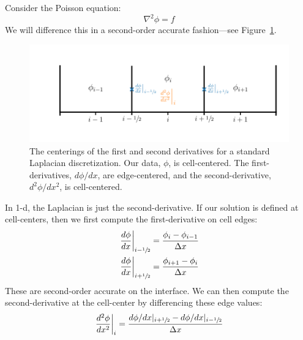 Consider the Poisson equation:
\begin{equation}
\nabla^2 \phi = f
\end{equation}
We will difference this in a second-order accurate fashion---see
Figure~\ref{fig:mg:laplacian}.  
\begin{figure}[t]
\centering
\includegraphics[width=\linewidth]{laplacian}
\caption{\label{fig:mg:laplacian} The centerings of the first and second
derivatives for a standard Laplacian discretization.  Our data, $\phi$,
is cell-centered.  The first-derivatives, $d\phi/dx$, are edge-centered, and the
second-derivative, $d^2\phi/dx^2$, is cell-centered.}
\end{figure}
%
In 1-d, the Laplacian is just the second-derivative.  If our solution
is defined at cell-centers, then we first compute the first-derivative
on cell edges:
\begin{align}
\left . \frac{d\phi}{dx} \right |_{i-{\sfrac{1}{2}}} &= \frac{\phi_i - \phi_{i-1}}{\Delta x}\\
\left . \frac{d\phi}{dx} \right |_{i+{\sfrac{1}{2}}} &= \frac{\phi_{i+1} - \phi_i}{\Delta x}
\end{align}
These are second-order accurate on the interface.  We can then compute
the second-derivative at the cell-center by differencing these edge values:
\begin{equation}
\left . \frac{d^2\phi}{dx^2} \right |_i = \frac{ d\phi/dx |_{i+{\sfrac{1}{2}}} - d\phi/dx |_{i-{\sfrac{1}{2}}}}{\Delta x}
\end{equation}

